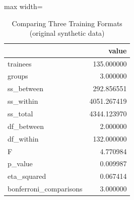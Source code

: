 \begin{table}[htbp]
\centering
\caption{Comparing Three Training Formats (original synthetic data)}
\begingroup
\small
\setlength{\tabcolsep}{6pt}
\renewcommand{\arraystretch}{1.12}
\begin{adjustbox}{max width=\linewidth}
\begin{tabular}{@{}lr@{}}
\toprule
 & value \\
\midrule
trainees & 135.000000 \\
groups & 3.000000 \\
ss\_between & 292.856551 \\
ss\_within & 4051.267419 \\
ss\_total & 4344.123970 \\
df\_between & 2.000000 \\
df\_within & 132.000000 \\
F & 4.770984 \\
p\_value & 0.009987 \\
eta\_squared & 0.067414 \\
bonferroni\_comparisons & 3.000000 \\
\bottomrule
\end{tabular}
\end{adjustbox}
\endgroup
\end{table}